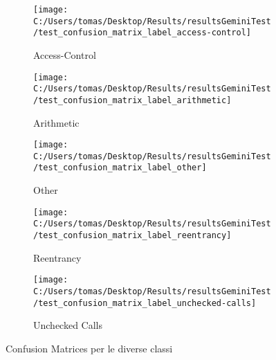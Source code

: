 \documentclass[../../Thesis.tex]{subfiles}
\begin{document}
\begin{figure}[h!]
    \centering
    \begin{subfigure}[b]{0.1999\textwidth}
        \centering
        \texttt{[image: C:/Users/tomas/Desktop/Results/resultsGeminiTest/test\_confusion\_matrix\_label\_access-control]}
        \caption{Access-Control}
    \end{subfigure}
    \begin{subfigure}[b]{0.1999\textwidth}
        \centering
        \texttt{[image: C:/Users/tomas/Desktop/Results/resultsGeminiTest/test\_confusion\_matrix\_label\_arithmetic]}
        \caption{Arithmetic}
    \end{subfigure}
    \begin{subfigure}[b]{0.1999\textwidth}
        \centering
        \texttt{[image: C:/Users/tomas/Desktop/Results/resultsGeminiTest/test\_confusion\_matrix\_label\_other]}
        \caption{Other}
    \end{subfigure}
    \begin{subfigure}[b]{0.1999\textwidth}
        \centering
        \texttt{[image: C:/Users/tomas/Desktop/Results/resultsGeminiTest/test\_confusion\_matrix\_label\_reentrancy]}
        \caption{Reentrancy}
    \end{subfigure}
    \begin{subfigure}[b]{0.1999\textwidth}
        \centering
        \texttt{[image: C:/Users/tomas/Desktop/Results/resultsGeminiTest/test\_confusion\_matrix\_label\_unchecked-calls]}
        \caption{Unchecked Calls}
    \end{subfigure}
    \caption{Confusion Matrices per le diverse classi}
\end{figure}
\end{document}
